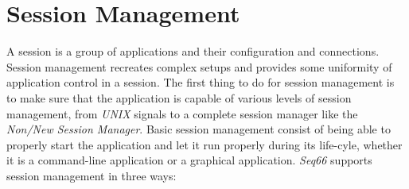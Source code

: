 %
%
%

\section{Session Management}
\label{sec:sessions}

   A session is a group of applications and their configuration and
   connections.
   Session management recreates complex setups and provides some uniformity
   of application control in a session.
   The first thing to do for session management is to make sure that the
   application is capable of various levels of session management, from
   \textsl{UNIX} signals to
   a complete session manager like the \textsl{Non/New Session Manager}.
   Basic session management consist of being able to properly start the
   application and let it run properly during its life-cyle, whether it is a
   command-line application or a graphical application.
   \textsl{Seq66} supports session management in three ways:

